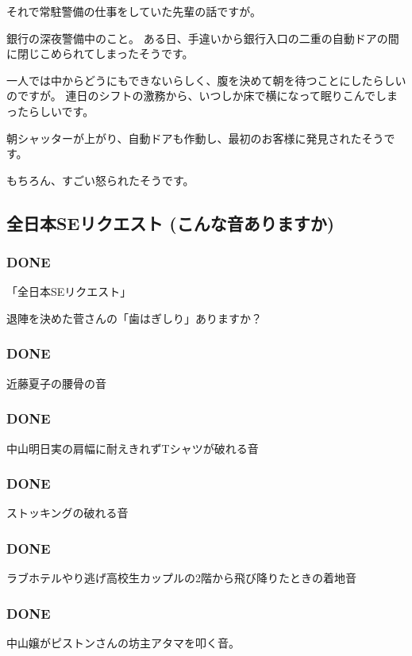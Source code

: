 \documentclass[11pt]{article}
\begin{document}
それで常駐警備の仕事をしていた先輩の話ですが。

銀行の深夜警備中のこと。
ある日、手違いから銀行入口の二重の自動ドアの間に閉じこめられてしまったそうです。

一人では中からどうにもできないらしく、腹を決めて朝を待つことにしたらしいのですが。
連日のシフトの激務から、いつしか床で横になって眠りこんでしまったらしいです。

朝シャッターが上がり、自動ドアも作動し、最初のお客様に発見されたそうです。

もちろん、すごい怒られたそうです。
\subsection{全日本SEリクエスト (こんな音ありますか)}
\label{sec-104_2}
\subsubsection{\textbf{DONE}}
\label{sec-104_2_1}

「全日本SEリクエスト」

退陣を決めた菅さんの「歯はぎしり」ありますか？
\subsubsection{\textbf{DONE}}
\label{sec-104_2_2}

近藤夏子の腰骨の音
\subsubsection{\textbf{DONE}}
\label{sec-104_2_3}

中山明日実の肩幅に耐えきれずTシャツが破れる音
\subsubsection{\textbf{DONE}}
\label{sec-104_2_4}

ストッキングの破れる音
\subsubsection{\textbf{DONE}}
\label{sec-104_2_5}

ラブホテルやり逃げ高校生カップルの2階から飛び降りたときの着地音
\subsubsection{\textbf{DONE}}
\label{sec-104_2_6}

中山嬢がピストンさんの坊主アタマを叩く音。
\end{document}
